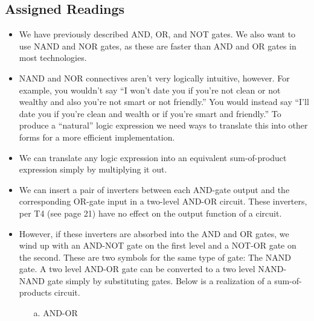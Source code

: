 \documentclass[10pt,a4paper]{article}
\begin{document}
\subsection{Assigned Readings}
\begin{itemize}
\item We have previously described AND, OR, and NOT gates. We also want to use NAND and NOR gates, as these are faster than AND and OR gates in most technologies. 
\pagebreak
\item NAND and NOR connectives aren't very logically intuitive, however. For example, you wouldn't say ``I won't date you if you're not clean or not wealthy and also you're not smart or not friendly.'' You would instead say ``I'll date you if you're clean and wealth or if you're smart and friendly.'' To produce a ``natural'' logic expression we need ways to translate this into other forms for a more efficient implementation. 
\item We can translate any logic expression into an equivalent sum-of-product expression simply by multiplying it out. 
\item We can insert a pair of inverters between each AND-gate output and the corresponding OR-gate input in a two-level AND-OR circuit. These inverters, per T4 (see page 21) have no effect on the output function of a circuit. 
\item However, if these inverters are absorbed into the AND and OR gates, we wind up with an AND-NOT gate on the first level and a NOT-OR gate on the second. These are two symbols for the same type of gate: The NAND gate. A two level AND-OR gate can be converted to a two level NAND-NAND gate simply by substituting gates. Below is a realization of a sum-of-products circuit.
\begin{enumerate}
\item [a.] AND-OR\\
\end{enumerate}
\end{itemize}
\end{document}
